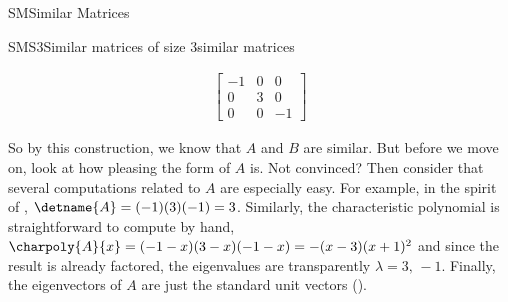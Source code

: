 \begin{subsect}{SM}{Similar Matrices}
\begin{example}{SMS3}{Similar matrices of size 3}{similar matrices}
\begin{para}
\begin{align*}
\begin{bmatrix}
-1 & 0 & 0 \\
0 & 3 & 0 \\
0 & 0 & -1
\end{bmatrix}
%
\end{align*}
\end{para}
%
\begin{para}So by this construction, we know that $A$ and $B$ are similar.  But before we move on, look at how pleasing the form of $A$ is.  Not convinced?  Then consider that several computations related to $A$ are especially easy.  For example, in the spirit of , $\detname{A}=(-1)(3)(-1)=3$.  Similarly, the characteristic polynomial is straightforward to compute by hand, $\charpoly{A}{x}=(-1-x)(3-x)(-1-x)=-(x-3)(x+1)^2$ and since the result is already factored, the eigenvalues are transparently $\lambda=3,\,-1$.  Finally, the eigenvectors of $A$ are just the standard unit vectors ().\end{para}
%
\end{example}
%
\end{subsect}
%
